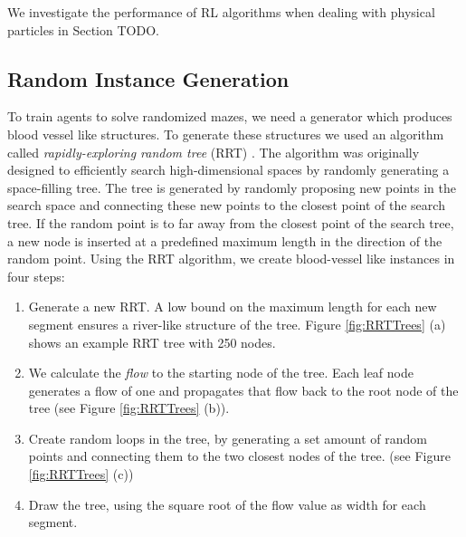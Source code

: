We investigate the performance of RL algorithms when dealing with physical particles in Section TODO.

\subsection{Random Instance Generation} \label{sec:RandomInstanceGeneration}
To train agents to solve randomized mazes, we need a generator which produces blood vessel like structures. To generate these structures we used an algorithm called \textit{rapidly-exploring random tree} (RRT) \cite{lavalle1998rapidly}. The algorithm was originally designed to efficiently search high-dimensional spaces by randomly generating a space-filling tree. The tree is generated by randomly proposing new points in the search space and connecting these new points to the closest point of the search tree. If the random point is to far away from the closest point of the search tree, a new node is inserted at a predefined maximum length in the direction of the random point. Using the RRT algorithm, we create blood-vessel like instances in four steps:

\begin{enumerate}
    \item Generate a new RRT. A low bound on the maximum length for each new segment ensures a river-like structure of the tree. Figure \ref{fig:RRTTrees} (a) shows an example RRT tree with 250 nodes.
    \item We calculate the \textit{flow} to the starting node of the tree. Each leaf node generates a flow of one and propagates that flow back to the root node of the tree (see Figure \ref{fig:RRTTrees} (b)).
    \item Create random loops in the tree, by generating a set amount of random points and connecting them to the two closest nodes of the tree. (see Figure \ref{fig:RRTTrees} (c))
    \item Draw the tree, using the square root of the flow value as width for each segment.
\end{enumerate}

